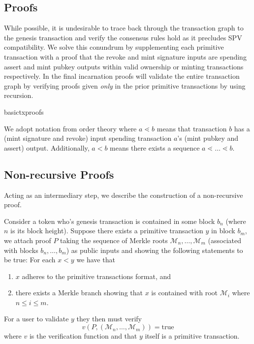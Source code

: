 \documentclass[9pt,oneside]{amsart}
\begin{document}
\begin{multicols}{2}
\section{Proofs}
While possible, it is undesirable to trace back through the transaction graph to the genesis transaction and verify the consensus rules hold as it precludes SPV compatibility. We solve this conundrum by supplementing each primitive transaction with a proof that the revoke and mint signature inputs are spending assert and mint pubkey outputs within valid ownership or minting transactions respectively. In the final incarnation proofs will validate the entire transaction graph by verifying proofs given \emph{only} in the prior primitive transactions by using recursion.

\begin{center}
    {basictxproofs}
\end{center}

We adopt notation from order theory where $a \lessdot b$ means that transaction $b$ has a (mint signature and revoke) input spending transaction $a$'s (mint pubkey and assert) output.  Additionally, $a < b$ means there exists a sequence $a \lessdot \dots \lessdot b$.
\subsection{Non-recursive Proofs}
Acting as an intermediary step, we describe the construction of a non-recursive proof.

Consider a token who's genesis transaction is contained in some block $b_{n}$ (where $n$ is its block height). Suppose there exists a primitive transaction $y$ in block $b_{m}$, we attach proof $P$ taking the sequence of Merkle roots $\mathcal{M}_{n}, \dots, \mathcal{M}_{m}$ (associated with blocks $b_{n}, \dots, b_{m}$) as public inputs and showing the following statements to be true:
For each $x < y$ we have that
\begin{enumerate}
    \item $x$ adheres to the primitive transactions format, and
    \item there exists a Merkle branch showing that $x$ is contained with root $\mathcal{M}_{i}$ where $n \leq i \leq m$.
\end{enumerate}

For a user to validate $y$ they then must verify
\[v(P, (\mathcal{M}_{n}, \dots, \mathcal{M}_{m})) = \text{true}\]
where $v$ is the verification function and that $y$ itself is a primitive transaction.


\end{multicols}
\end{document}

